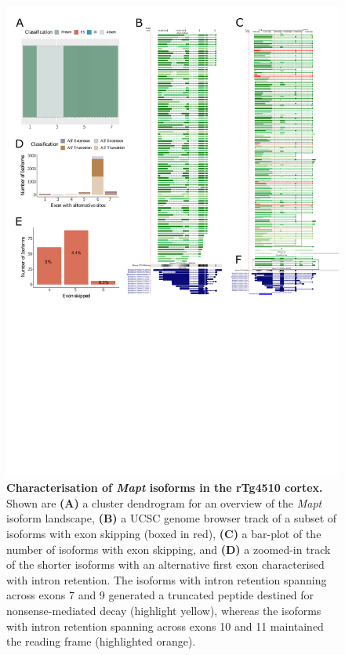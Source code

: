 \begin{figure}[htp]
	\centering
	\includegraphics[page=5,trim={0 10cm 0 0},scale = 0.85]{Figures/TargetGenes_Annotation_Portrait.pdf}
	\captionsetup{width=0.95\textwidth}
	\caption[Characterisation of \textit{Mapt} isoforms in the rTg4510 cortex]%
	{\textbf{Characterisation of \textit{Mapt} isoforms in the rTg4510 cortex.} Shown are \textbf{(A)} a cluster dendrogram for an overview of the \textit{Mapt} isoform landscape, \textbf{(B)} a UCSC genome browser track of a subset of isoforms with exon skipping (boxed in red), \textbf{(C)} a bar-plot of the number of isoforms with exon skipping, and \textbf{(D)} a zoomed-in track of the shorter isoforms with an alternative first exon characterised with intron retention. The isoforms with intron retention spanning across exons 7 and 9 generated a truncated peptide destined for nonsense-mediated decay (highlight yellow), whereas the isoforms with intron retention spanning across exons 10 and 11 maintained the reading frame (highlighted orange).}    
	\label{fig:mapt}
\end{figure}
\restoregeometry

